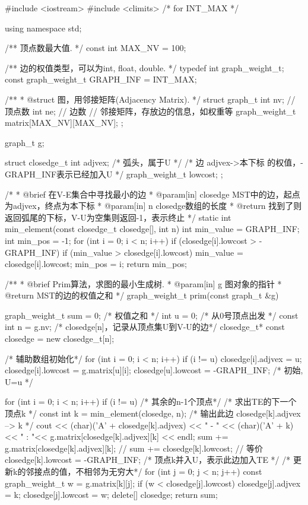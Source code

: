 \begin{Codex}[label=am_graph_prim1.cpp]
#include <iostream>
#include <climits>  /* for INT_MAX */

using namespace std;

/** 顶点数最大值. */
const int MAX_NV = 100;

/** 边的权值类型，可以为int, float, double. */
typedef int graph_weight_t;
const graph_weight_t GRAPH_INF = INT_MAX;

/**
 * @struct 图，用邻接矩阵(Adjacency Matrix).
 */
struct graph_t {
    int nv; // 顶点数
    int ne; // 边数
    // 邻接矩阵，存放边的信息，如权重等
    graph_weight_t matrix[MAX_NV][MAX_NV];
};

graph_t g;

struct closedge_t {
    int adjvex; /* 弧头，属于U */
    /* 边 adjvex->本下标 的权值，-GRAPH_INF表示已经加入U */
    graph_weight_t lowcost;
};

/*
 * @brief 在V-E集合中寻找最小的边
 * @param[in] closedge MST中的边，起点为adjvex，终点为本下标
 * @param[in] n closedge数组的长度
 * @return 找到了则返回弧尾的下标，V-U为空集则返回-1，表示终止
 */
static int min_element(const closedge_t closedge[], int n) {
    int min_value = GRAPH_INF;
    int min_pos = -1;
    for (int i = 0; i < n; i++)
        if (closedge[i].lowcost > -GRAPH_INF) {
            if (min_value > closedge[i].lowcost) {
                min_value = closedge[i].lowcost;
                min_pos = i;
            }
        }
    return min_pos;
}

/**
 * @brief Prim算法，求图的最小生成树.
 * @param[in] g 图对象的指针
 * @return MST的边的权值之和
 */
graph_weight_t prim(const graph_t &g) {
    graph_weight_t sum = 0; /* 权值之和 */
    int u = 0; /* 从0号顶点出发 */
    const int n = g.nv;
    /* closedge[n]，记录从顶点集U到V-U的边*/
    closedge_t* const closedge = new closedge_t[n];

    /* 辅助数组初始化*/
    for (int i = 0; i < n; i++) if (i != u) {
        closedge[i].adjvex = u;
        closedge[i].lowcost = g.matrix[u][i];
    }
    closedge[u].lowcost = -GRAPH_INF; /* 初始, U={u} */

    for (int i = 0; i < n; i++) if (i != u) { /* 其余的n-1个顶点*/
        /* 求出TE的下一个顶点k */
        const int k = min_element(closedge, n);
        /* 输出此边 closedge[k].adjvex --> k */
        cout << (char)('A' + closedge[k].adjvex) << " - " << (char)('A' + k)
                << " : "<< g.matrix[closedge[k].adjvex][k] << endl;
        sum += g.matrix[closedge[k].adjvex][k];
        // sum += closedge[k].lowcost;  // 等价
        closedge[k].lowcost = -GRAPH_INF;  /* 顶点k并入U，表示此边加入TE */
        /* 更新k的邻接点的值，不相邻为无穷大*/
        for (int j = 0; j < n; j++) {
            const graph_weight_t w = g.matrix[k][j];
            if (w < closedge[j].lowcost) {
                closedge[j].adjvex = k;
                closedge[j].lowcost = w;
            }
        }
    }
    delete[] closedge;
    return sum;
}


\end{Codex}
